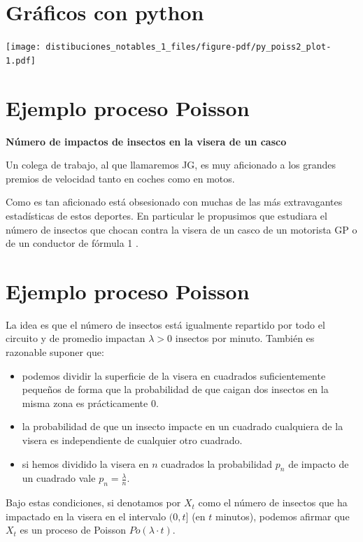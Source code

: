 \documentclass[
  letterpaper,
  DIV=11,
  numbers=noendperiod]{scrreprt}
\providecommand{\tightlist}{%
  \setlength{\itemsep}{0pt}\setlength{\parskip}{0pt}}\usepackage{longtable,booktabs,array}
\begin{document}
\section{Gráficos con python}\label{gruxe1ficos-con-python-4}

\begin{center}
\texttt{[image: distibuciones\_notables\_1\_files/figure-pdf/py\_poiss2\_plot-1.pdf]}
\end{center}

\section{Ejemplo proceso Poisson}\label{ejemplo-proceso-poisson}

\textbf{Número de impactos de insectos en la visera de un casco}

Un colega de trabajo, al que llamaremos JG, es muy aficionado a los
grandes premios de velocidad tanto en coches como en motos.

Como es tan aficionado está obsesionado con muchas de las más
extravagantes estadísticas de estos deportes. En particular le
propusimos que estudiara el número de insectos que chocan contra la
visera de un casco de un motorista GP o de un conductor de fórmula 1 .

\section{Ejemplo proceso Poisson}\label{ejemplo-proceso-poisson-1}

La idea es que el número de insectos está igualmente repartido por todo
el circuito y de promedio impactan \(\lambda>0\) insectos por minuto.
También es razonable suponer que:

\begin{itemize}
\tightlist
\item
  podemos dividir la superficie de la visera en cuadrados
  suficientemente pequeños de forma que la probabilidad de que caigan
  dos insectos en la misma zona es prácticamente 0.
\item
  la probabilidad de que un insecto impacte en un cuadrado cualquiera de
  la visera es independiente de cualquier otro cuadrado.
\item
  si hemos dividido la visera en \(n\) cuadrados la probabilidad \(p_n\)
  de impacto de un cuadrado vale \(p_n=\frac{\lambda}{n}\).
\end{itemize}

Bajo estas condiciones, si denotamos por \(X_t\) como el número de
insectos que ha impactado en la visera en el intervalo \((0,t]\) (en
\(t\) minutos), podemos afirmar que \(X_t\) es un proceso de Poisson
\(Po(\lambda\cdot t)\).
\end{document}
